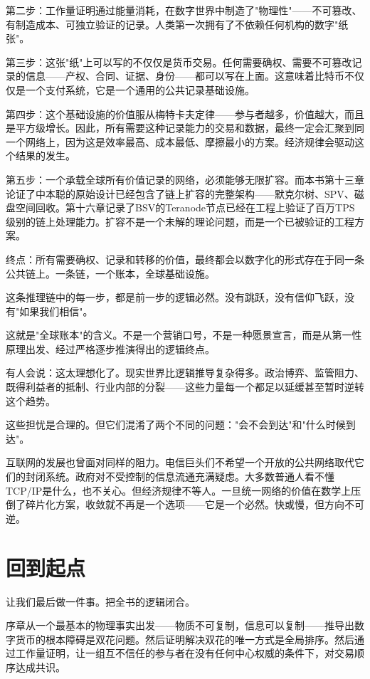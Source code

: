 \documentclass[a4paper,12pt,openany]{ctexbook}
\begin{document}
第二步：工作量证明通过能量消耗，在数字世界中制造了"物理性"——不可篡改、有制造成本、可独立验证的记录。人类第一次拥有了不依赖任何机构的数字"纸张"。

第三步：这张"纸"上可以写的不仅仅是货币交易。任何需要确权、需要不可篡改记录的信息——产权、合同、证据、身份——都可以写在上面。这意味着比特币不仅仅是一个支付系统，它是一个通用的公共记录基础设施。

第四步：这个基础设施的价值服从梅特卡夫定律——参与者越多，价值越大，而且是平方级增长。因此，所有需要这种记录能力的交易和数据，最终一定会汇聚到同一个网络上，因为这是效率最高、成本最低、摩擦最小的方案。经济规律会驱动这个结果的发生。

第五步：一个承载全球所有价值记录的网络，必须能够无限扩容。而本书第十三章论证了中本聪的原始设计已经包含了链上扩容的完整架构——默克尔树、SPV、磁盘空间回收。第十六章记录了BSV的Teranode节点已经在工程上验证了百万TPS级别的链上处理能力。扩容不是一个未解的理论问题，而是一个已被验证的工程方案。

终点：所有需要确权、记录和转移的价值，最终都会以数字化的形式存在于同一条公共链上。一条链，一个账本，全球基础设施。

这条推理链中的每一步，都是前一步的逻辑必然。没有跳跃，没有信仰飞跃，没有"如果我们相信"。

这就是"全球账本"的含义。不是一个营销口号，不是一种愿景宣言，而是从第一性原理出发、经过严格逐步推演得出的逻辑终点。

有人会说：这太理想化了。现实世界比逻辑推导复杂得多。政治博弈、监管阻力、既得利益者的抵制、行业内部的分裂——这些力量每一个都足以延缓甚至暂时逆转这个趋势。

这些担忧是合理的。但它们混淆了两个不同的问题："会不会到达"和"什么时候到达"。

互联网的发展也曾面对同样的阻力。电信巨头们不希望一个开放的公共网络取代它们的封闭系统。政府对不受控制的信息流通充满疑虑。大多数普通人看不懂TCP/IP是什么，也不关心。但经济规律不等人。一旦统一网络的价值在数学上压倒了碎片化方案，收敛就不再是一个选项——它是一个必然。快或慢，但方向不可逆。


\section*{回到起点}


让我们最后做一件事。把全书的逻辑闭合。

序章从一个最基本的物理事实出发——物质不可复制，信息可以复制——推导出数字货币的根本障碍是双花问题。然后证明解决双花的唯一方式是全局排序。然后通过工作量证明，让一组互不信任的参与者在没有任何中心权威的条件下，对交易顺序达成共识。
\end{document}
